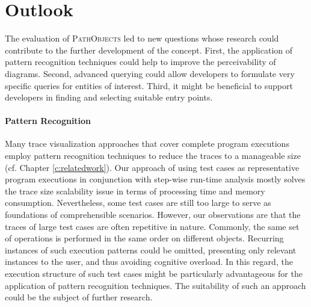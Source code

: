 \section{Outlook}
\label{s:ConclusionsFuture}
The evaluation of \textsc{PathObjects} led to new questions whose research could contribute to the further development of the concept.
First, the application of pattern recognition techniques could help to improve the perceivability of diagrams.
Second, advanced querying could allow developers to formulate very specific queries for entities of interest.
Third, it might be beneficial to support developers in finding and selecting suitable entry points.

\paragraph{Pattern Recognition} Many trace visualization approaches that cover complete program executions employ pattern recognition techniques to reduce the traces to a manageable size (cf. Chapter \ref{c:relatedwork}).
Our approach of using test cases as representative program executions in conjunction with step-wise run-time analysis mostly solves the trace size scalability issue in terms of processing time and memory consumption.
Nevertheless, some test cases are still too large to serve as foundations of comprehensible scenarios.
However, our observations are that the traces of large test cases are often repetitive in nature. Commonly, the same set of operations is performed in the same order on different objects.
Recurring instances of such execution patterns could be omitted, presenting only relevant instances to the user, and thus avoiding cognitive overload.
In this regard, the execution structure of such test cases might be particularly advantageous for the application of pattern recognition techniques.
The suitability of such an approach could be the subject of further research.

